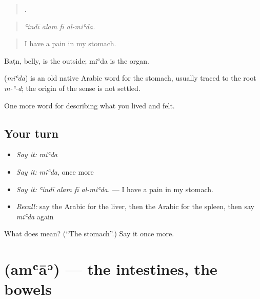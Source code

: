 \begin{quote}
   .
\end{quote}

\begin{quote}
\emph{ʿindī alam fī al-miʿda.}
\end{quote}

\begin{quote}
I have a pain in my stomach.
\end{quote}

Baṭn, belly, is the outside; miʿda is the organ.

\begin{cousinweb}
\textbf{} (\emph{miʿda}) is an old native Arabic word for the stomach, usually traced to the root \emph{m-ʿ-d}; the origin of the sense is not settled.
\end{cousinweb}

\begin{grammarlens}[title={What you've built}]
One more word for describing what you lived and felt.
\end{grammarlens}

\subsection*{Your turn}
\begin{itemize}
\raggedright
  \item \emph{Say it:} \emph{miʿda}
  \item \emph{Say it:} \emph{miʿda}, once more
  \item \emph{Say it:} \emph{ʿindī alam fī al-miʿda.} — I have a pain in my stomach.
  \item \emph{Recall:} say the Arabic for the liver, then the Arabic for the spleen, then say \emph{miʿda} again
\end{itemize}

\begin{tcolorbox}[breakable,colback=teal!4,colframe=teal!35!black,title={Before you move on}]
What does  mean? (\textquotedblleft{}The stomach\textquotedblright{}.) Say it once more.
\end{tcolorbox}
\section[\texorpdfstring{\ar{أمعاء} (amʿāʾ)}{أمعاء (amʿāʾ)}]{ (amʿāʾ) — the intestines, the bowels}

\label{lesson:AR-C504-ama}



